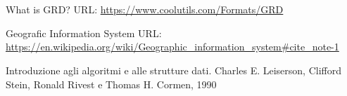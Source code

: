 \chapter*{}
  \begin{thebibliography}{}

  	 What is GRD? URL: \url{https://www.coolutils.com/Formats/GRD}

     Geografic Information System URL: \url{https://en.wikipedia.org/wiki/Geographic\_information\_system\#cite\_note-1}

    \bibitem{} Introduzione agli algoritmi e alle strutture dati. Charles E. Leiserson, Clifford Stein, Ronald Rivest e Thomas H. Cormen, 1990

  \end{thebibliography}